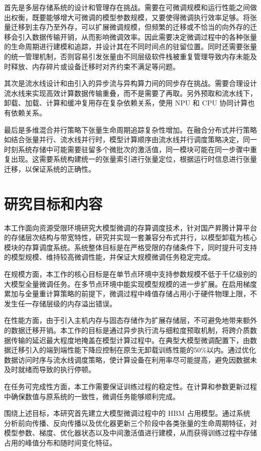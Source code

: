\documentclass[bachelor,openany,oneside,color,AutoFakeBold=true]{buaathesis}
\begin{document}
首先是多层存储系统的设计和管理存在挑战。需要在可微调规模和运行性能之间做出权衡，既要能够增大可微调的模型参数规模，又要使得微调执行效率足够。将张量迁移到主存乃至外存，可以扩展微调规模，但频繁的迁移或不恰当的向外存的迁移会引入数据传输开销，从而影响微调效率。因此需要决定微调过程中的各种张量的生命周期进行建模和追踪，并设计其在不同时间点的驻留位置。同时还需要张量的统一管理机制，否则容易引发张量由不同层级软件栈被重复管理导致内存未能及时释放、内存碎片或设备迁移时对齐约束不满足等问题。


其次是流水线设计和由引入的异步流与异构算力间的同步存在挑战。需要合理设计流水线来实现高效计算数据传输重叠，而不是需要了再取。另外预取和流水线下，卸载、加载、计算和缓冲复用存在复杂依赖关系，使用 NPU 和 CPU 协同计算也有依赖关系。

最后是多维混合并行策略下张量生命周期追踪复杂性增加。在融合分布式并行策略如结合张量并行、流水线并行时，模型计算顺序由流水线并行调度策略决定，同一时刻系统存储中可能需要驻留多个微批次的激活值，同一模块可能在同一步骤中重复出现。这需要系统构建统一的张量索引进行张量定位，根据运行时信息进行张量迁移，以保证系统的正确性。


\section{研究目标和内容}

本工作面向资源受限环境研究大模型微调的存算调度技术，针对国产昇腾计算平台的存储层次结构与带宽特性，研究并实现一套兼容分布式并行，以模型卸载为核心模块的存算调度系统。系统整体目标是在严格受限的存储条件下，同时提升可支持的模型规模、维持较高微调性能，并保证大规模微调任务稳定完成。

在规模方面，本工作的核心目标是在单节点环境中支持参数规模不低于千亿级别的大模型全量微调任务。在多节点环境中能实现模型规模的进一步扩展。在启用梯度累加与全量重计算策略的前提下，微调过程中峰值存储占用小于硬件物理上限，不发生任一存储层级的内存溢出错误。

在性能方面，由于引入主机内存与固态存储作为扩展存储层，不可避免地带来额外的数据迁移开销。本工作的目标是通过异步执行流与细粒度预取机制，将跨介质数据传输的延迟最大程度地掩盖在模型计算过程中。在典型大模型微调配置下，由数据迁移引入的端到端性能下降应控制在原生无卸载训练性能的50\%以内。通过优化数据访问时序与流水线调度策略，使计算设备在利用率尽可能提高，避免因数据未及时就绪而导致的执行停顿。

在任务可完成性方面，本工作需要保证训练过程的稳定性。在计算和参数更新过程中确保数值与原系统的一致性，微调任务能够顺利完成。

围绕上述目标，本研究首先建立大模型微调过程中的 HBM 占用模型。通过系统分析前向传播、反向传播以及优化器更新三个阶段中各类张量的生命周期特征，对模型参数、梯度、优化器状态以及中间激活值进行建模，从而获得训练过程中存储占用的峰值分布和随时间变化特征。
\end{document}
